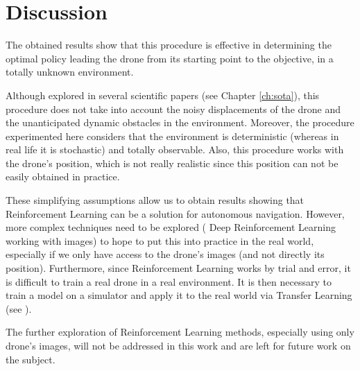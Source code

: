 \section{Discussion}

The obtained results show that this procedure is effective in determining the optimal policy leading the drone from its starting point to the objective, in a totally unknown environment.

Although explored in several scientific papers (see Chapter \ref{ch:sota}), this procedure does not take into account the noisy displacements of the drone and the unanticipated dynamic obstacles in the environment. Moreover, the procedure experimented here considers that the environment is deterministic (whereas in real life it is stochastic) and totally observable. Also, this procedure works with the drone's position, which is not really realistic since this position can not be easily obtained in practice.

These simplifying assumptions allow us to obtain results showing that Reinforcement Learning can be a solution for autonomous navigation. However, more complex techniques need to be explored (\eg{} Deep Reinforcement Learning working with images) to hope to put this into practice in the real world, especially if we only have access to the drone's images (and not directly its position). Furthermore, since Reinforcement Learning works by trial and error, it is difficult to train a real drone in a real environment. It is then necessary to train a model on a simulator and apply it to the real world via Transfer Learning (see \cite{anwar2020autonomous}).

The further exploration of Reinforcement Learning methods, especially using only drone's images, will not be addressed in this work and are left for future work on the subject.
